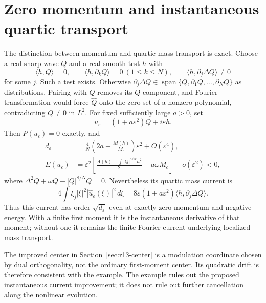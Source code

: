\section{Zero momentum and instantaneous quartic transport}
The distinction between momentum and quartic mass transport is exact.
Choose a real sharp wave $Q$ and a real smooth test $h$ with
\[
 \langle h,Q\rangle=0,\qquad
 \langle h,\partial_kQ\rangle=0\ (1\le k\le N),\qquad
 \langle h,\partial_j\Delta Q\rangle\ne0
\]
for some $j$. Such a test exists. Otherwise
$\partial_j\Delta Q\in\operatorname{span}\{Q,\partial_1Q,\ldots,
\partial_NQ\}$ as distributions. Pairing with $Q$ removes its $Q$
component, and Fourier transformation would force $\widehat Q$ onto
the zero set of a nonzero polynomial, contradicting $Q\ne0$ in $L^2$.
For fixed sufficiently large $a>0$, set
\[
 u_\varepsilon=(1+a\varepsilon^2)Q+i\varepsilon h.
\]
Then $P(u_\varepsilon)=0$ exactly, and
\begin{align*}
 d_\varepsilon
 &=\frac4N\left(2a+\frac{M(h)}{M_c}\right)\varepsilon^2
       +O(\varepsilon^4),\\
 E(u_\varepsilon)
 &=\varepsilon^2\left[
 \frac{A(h)-\int|Q|^{8/N}h^2}{2}-a\omega M_c\right]
       +o(\varepsilon^2)<0,
\end{align*}
where $\Delta^2Q+\omega Q-|Q|^{8/N}Q=0$.
Nevertheless its quartic mass current is
\[
 4\int\xi_j|\xi|^2|\widehat u_\varepsilon(\xi)|^2\,d\xi
 =8\varepsilon(1+a\varepsilon^2)
             \langle h,\partial_j\Delta Q\rangle.
\]
Thus this current has order $\sqrt{d_\varepsilon}$ even at exactly zero
momentum and negative energy. With a finite first moment it is the
instantaneous derivative of that moment; without one it remains the
finite Fourier current underlying localized mass transport.


The improved center in Section~\ref{sec:r13-center} is a modulation
coordinate chosen by dual orthogonality, not the ordinary first-moment
center. Its quadratic drift is therefore consistent with the example.
The example rules out the proposed instantaneous current improvement;
it does not rule out further cancellation along the nonlinear evolution.
